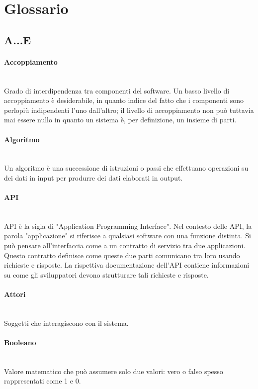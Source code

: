\section{Glossario}

\subsection{A...E}

\paragraph{Accoppiamento}~\smallskip \\
Grado di interdipendenza tra componenti del software. Un basso livello di accoppiamento è desiderabile, in quanto indice del fatto che i componenti sono perlopiù indipendenti l'uno dall'altro; il livello di accoppiamento non può tuttavia mai essere nullo in quanto un sistema è, per definizione, un insieme di parti.

\paragraph{Algoritmo}~\smallskip \\
Un algoritmo è una successione di istruzioni o passi che effettuano operazioni su dei dati in input per produrre dei dati elaborati in output.

\paragraph{API}~\smallskip \\
API è la sigla di "Application Programming Interface". Nel contesto delle API, la parola "applicazione" si riferisce a qualsiasi software con una funzione distinta. Si può pensare all'interfaccia come a un contratto di servizio tra due applicazioni. Questo contratto definisce come queste due parti comunicano tra loro usando richieste e risposte. La rispettiva documentazione dell'API contiene informazioni su come gli sviluppatori devono strutturare tali richieste e risposte.

\paragraph{Attori}~\smallskip \\
Soggetti che interagiscono con il sistema.

\paragraph{Booleano}~\smallskip \\
Valore matematico che può assumere solo due valori: vero o falso spesso rappresentati come 1 e 0.

